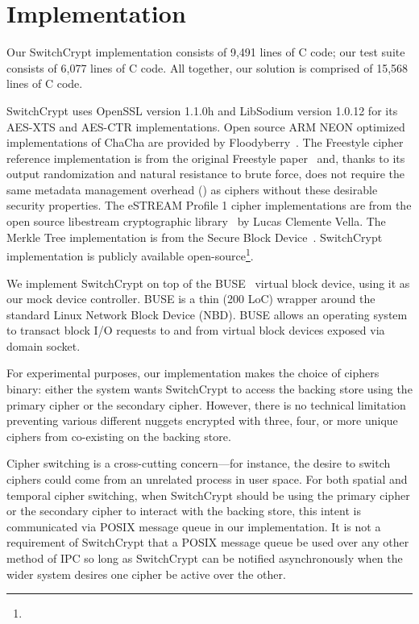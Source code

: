 \section{Implementation}\label{sec:implementation}

Our SwitchCrypt implementation consists of 9,491 lines of C code; our test suite
consists of 6,077 lines of C code. All together, our solution is comprised of
15,568 lines of C code. 

SwitchCrypt uses OpenSSL version 1.1.0h and LibSodium version 1.0.12 for its
AES-XTS and AES-CTR implementations. Open source ARM NEON optimized
implementations of ChaCha are provided by Floodyberry~\cite{Floodyberry}. The
Freestyle cipher reference implementation is from the original Freestyle
paper~\cite{Freestyle} and, thanks to its output randomization and natural
resistance to brute force, does not require the same metadata management
overhead () as ciphers
without these desirable security properties. The eSTREAM Profile 1 cipher
implementations are from the open source libestream cryptographic
library~\cite{libestream} by Lucas Clemente Vella. The Merkle Tree
implementation is from the Secure Block Device~\cite{SBD}. SwitchCrypt
implementation is publicly available open-source\footnote{\SystemURI}.

We implement SwitchCrypt on top of the BUSE~\cite{BUSE} virtual block device,
using it as our mock device controller. BUSE is a thin (200 LoC) wrapper around
the standard Linux Network Block Device (NBD). BUSE allows an operating system
to transact block I/O requests to and from virtual block devices exposed via
domain socket.

For experimental purposes, our implementation makes the choice of ciphers
binary: either the system wants SwitchCrypt to access the backing store using the
primary cipher or the secondary cipher. However, there is no technical
limitation preventing various different nuggets encrypted with three, four, or
more unique ciphers from co-existing on the backing store.

Cipher switching is a cross-cutting concern---for instance, the desire to switch
ciphers could come from an unrelated process in user space. For both spatial and
temporal cipher switching, when SwitchCrypt should be using the primary cipher or
the secondary cipher to interact with the backing store, this intent is
communicated via POSIX message queue in our implementation. It is not a
requirement of SwitchCrypt that a POSIX message queue be used over any other
method of IPC so long as SwitchCrypt can be notified asynchronously when the wider
system desires one cipher be active over the other.


